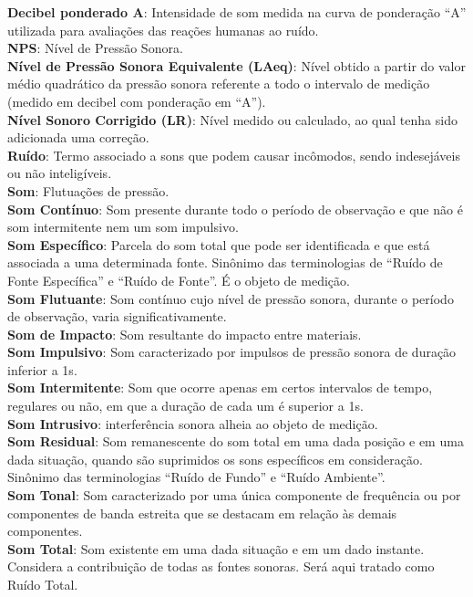 \textbf{Decibel ponderado A}: Intensidade de som medida na curva de ponderação “A” utilizada para avaliações das reações humanas ao ruído. \\
\textbf{NPS}: Nível de Pressão Sonora.  \\
\textbf{Nível de Pressão Sonora Equivalente (LAeq)}: Nível obtido a partir do valor médio quadrático da pressão sonora referente a todo o intervalo de medição (medido em decibel com ponderação em “A”). \\
\textbf{Nível Sonoro Corrigido (LR)}: Nível medido ou calculado, ao qual tenha sido adicionada uma correção. \\
\textbf{Ruído}: Termo associado a sons que podem causar incômodos, sendo indesejáveis ou não inteligíveis. \\
\textbf{Som}: Flutuações de pressão. \\
\textbf{Som Contínuo}: Som presente durante todo o período de observação e que não é som intermitente nem um som impulsivo. \\
\textbf{Som Específico}: Parcela do som total que pode ser identificada e que está associada a uma determinada fonte. Sinônimo das terminologias de “Ruído de Fonte Específica” e “Ruído de Fonte”. É o objeto de medição. \\
\textbf{Som Flutuante}: Som contínuo cujo nível de pressão sonora, durante o período de observação, varia significativamente.\\
\textbf{Som de Impacto}: Som resultante do impacto entre materiais. \\
\textbf{Som Impulsivo}: Som caracterizado por impulsos de pressão sonora de duração inferior a 1s. \\
\textbf{Som Intermitente}: Som que ocorre apenas em certos intervalos de tempo, regulares ou não, em que a duração de cada um é superior a 1s. \\
\textbf{Som Intrusivo}: interferência sonora alheia ao objeto de medição. \\
\textbf{Som Residual}: Som remanescente do som total em uma dada posição e em uma dada situação, quando são suprimidos os sons específicos em consideração. Sinônimo das terminologias “Ruído de Fundo” e “Ruído Ambiente”. \\
\textbf{Som Tonal}: Som caracterizado por uma única componente de frequência ou por componentes de banda estreita que se destacam em relação às demais componentes.  \\
\textbf{Som Total}: Som existente em uma dada situação e em um dado instante. Considera a contribuição de todas as fontes sonoras. Será aqui tratado como Ruído Total. \\


